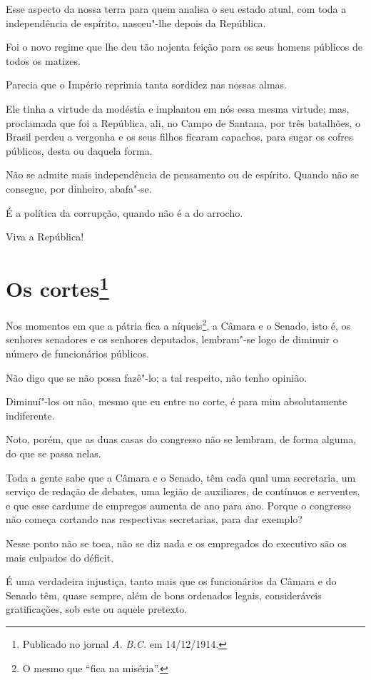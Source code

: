 Esse aspecto da nossa terra para quem analisa o seu estado atual, com
toda a independência de espírito, nasceu"-lhe depois da República.

Foi o novo regime que lhe deu tão nojenta feição para os seus homens
públicos de todos os matizes.

Parecia que o Império reprimia tanta sordidez nas nossas almas.

Ele tinha a virtude da modéstia e implantou em nós essa mesma virtude;
mas, proclamada que foi a República, ali, no Campo de Santana, por três
batalhões, o Brasil perdeu a vergonha e os seus filhos ficaram capachos,
para sugar os cofres públicos, desta ou daquela forma.

Não se admite mais independência de pensamento ou de espírito. Quando
não se consegue, por dinheiro, abafa"-se.

É a política da corrupção, quando não é a do arrocho.

Viva a República!


\chapter[Os cortes]{Os cortes\footnote[*]{Publicado no jornal \emph{A. B.C.} em 14/12/1914.}}

Nos momentos em que a pátria fica a níqueis\footnote{O mesmo que ``fica
  na miséria''.}, a Câmara e o Senado, isto é, os senhores senadores e
os senhores deputados, lembram"-se logo de diminuir o número de
funcionários públicos.

Não digo que se não possa fazê"-lo; a tal respeito, não tenho opinião.

Diminuí"-los ou não, mesmo que eu entre no corte, é para mim
absolutamente indiferente.

Noto, porém, que as duas casas do congresso não se lembram, de forma
alguma, do que se passa nelas.

Toda a gente sabe que a Câmara e o Senado, têm cada qual uma secretaria,
um serviço de redação de debates, uma legião de auxiliares, de contínuos
e serventes, e que esse cardume de empregos aumenta de ano para ano.
Porque o congresso não começa cortando nas respectivas secretarias, para
dar exemplo?

Nesse ponto não se toca, não se diz nada e os empregados do executivo
são os mais culpados do déficit.

É uma verdadeira injustiça, tanto mais que os funcionários da Câmara e
do Senado têm, quase sempre, além de bons ordenados legais,
consideráveis gratificações, sob este ou aquele pretexto.


